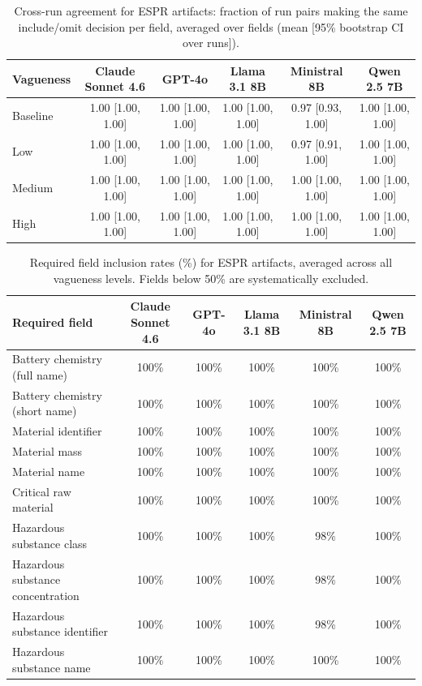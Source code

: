 \begin{table}[t]
  \centering
  \caption{Cross-run agreement for ESPR artifacts: fraction of run pairs making the same include/omit decision per field, averaged over fields (mean [95\% bootstrap CI over runs]).}
  \label{tab:espr_agreement}
  \begin{tabular}{lccccc}
    \toprule
    Vagueness & Claude Sonnet 4.6 & GPT-4o & Llama 3.1 8B & Ministral 8B & Qwen 2.5 7B \\
    \midrule
    Baseline & 1.00 {\scriptsize [1.00, 1.00]} & 1.00 {\scriptsize [1.00, 1.00]} & 1.00 {\scriptsize [1.00, 1.00]} & 0.97 {\scriptsize [0.93, 1.00]} & 1.00 {\scriptsize [1.00, 1.00]} \\
    Low & 1.00 {\scriptsize [1.00, 1.00]} & 1.00 {\scriptsize [1.00, 1.00]} & 1.00 {\scriptsize [1.00, 1.00]} & 0.97 {\scriptsize [0.91, 1.00]} & 1.00 {\scriptsize [1.00, 1.00]} \\
    Medium & 1.00 {\scriptsize [1.00, 1.00]} & 1.00 {\scriptsize [1.00, 1.00]} & 1.00 {\scriptsize [1.00, 1.00]} & 1.00 {\scriptsize [1.00, 1.00]} & 1.00 {\scriptsize [1.00, 1.00]} \\
    High & 1.00 {\scriptsize [1.00, 1.00]} & 1.00 {\scriptsize [1.00, 1.00]} & 1.00 {\scriptsize [1.00, 1.00]} & 1.00 {\scriptsize [1.00, 1.00]} & 1.00 {\scriptsize [1.00, 1.00]} \\
    \bottomrule
  \end{tabular}
\end{table}

\begin{table}[t]
  \centering
  \caption{Required field inclusion rates (\%) for ESPR artifacts, averaged across all vagueness levels. Fields below 50\% are systematically excluded.}
  \label{tab:espr_field_inclusion}
  \begin{tabular}{lccccc}
    \toprule
    Required field & Claude Sonnet 4.6 & GPT-4o & Llama 3.1 8B & Ministral 8B & Qwen 2.5 7B \\
    \midrule
    Battery chemistry (full name) & 100\% & 100\% & 100\% & 100\% & 100\% \\
    Battery chemistry (short name) & 100\% & 100\% & 100\% & 100\% & 100\% \\
    Material identifier & 100\% & 100\% & 100\% & 100\% & 100\% \\
    Material mass & 100\% & 100\% & 100\% & 100\% & 100\% \\
    Material name & 100\% & 100\% & 100\% & 100\% & 100\% \\
    Critical raw material & 100\% & 100\% & 100\% & 100\% & 100\% \\
    Hazardous substance class & 100\% & 100\% & 100\% & 98\% & 100\% \\
    Hazardous substance concentration & 100\% & 100\% & 100\% & 98\% & 100\% \\
    Hazardous substance identifier & 100\% & 100\% & 100\% & 98\% & 100\% \\
    Hazardous substance name & 100\% & 100\% & 100\% & 100\% & 100\% \\
    \bottomrule
  \end{tabular}
\end{table}

